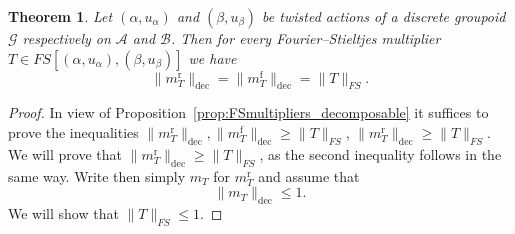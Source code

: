 \documentclass[11 pt, leqno]{amsart}
\numberwithin{equation}{section}
\theoremstyle{plain}
\newtheorem{thm}{Theorem}[section]
\theoremstyle{definition}
\DeclareMathOperator{\rd}{r}%
\DeclareMathOperator{\f}{f}%
\newcommand{\B}{\mathcal B}
\newcommand{\m}{m}
\newcommand{\G}{\mathcal G} %
\newcommand{\A}{\mathcal A}
\begin{document}
\begin{thm}\label{thm:FSmultipliers_decomposable_discrete}
Let $(\alpha,u_\alpha)$ and $(\beta, u_\beta)$ be twisted actions of a discrete groupoid $\G$ respectively on $\A$ and $\B$. 
Then for every Fourier--Stieltjes multiplier $T\in FS[(\alpha,u_{\alpha}),(\beta,u_{\beta})]$ we have 
\[
    \| \m_T^{\rd} \|_{\mathrm{dec}} = \| \m_T^{\f} \|_{\mathrm{dec}} = \|T\|_{FS} .
\] 
\end{thm}
\begin{proof}
In view of Proposition~\ref{prop:FSmultipliers_decomposable} it suffices to prove the inequalities $\|\m_T^{\rd}\|_{\mathrm{dec}} , \|\m_T^{\f}\|_{\mathrm{dec}} \geq \|T\|_{FS}$, $\|\m_T^{\rd}\|_{\mathrm{dec}} \geq \|T\|_{FS}$. 
We will prove that $\|\m_T^{\rd}\|_{\mathrm{dec}} \geq \|T\|_{FS}$, as the second inequality follows in the same way.
Write then simply $m_T$ for $\m_T^{\rd}$ and assume that 
\[
    \| \m_T \|_{\mathrm{dec}} \leq 1.
\] 
We will show that $\|T\|_{FS} \leq 1$.


\end{proof}
\end{document}
